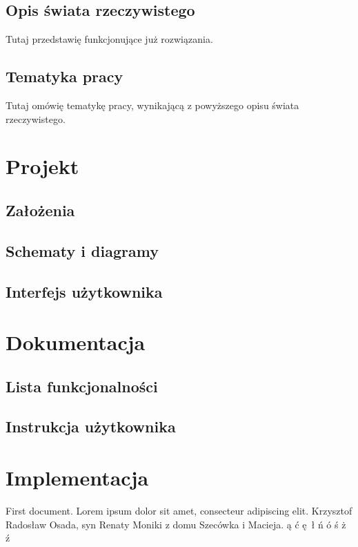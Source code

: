 \documentclass[12pt, a4paper]{article}
\begin{document}
    \subsection{Opis świata rzeczywistego}
    Tutaj przedstawię funkcjonujące już rozwiązania.

    \subsection{Tematyka pracy}
    Tutaj omówię tematykę pracy, wynikającą z powyższego opisu świata rzeczywistego.

    \section{Projekt}
    
    \subsection{Założenia}
    \subsection{Schematy i diagramy}
    \subsection{Interfejs użytkownika}

    \section{Dokumentacja}
    \subsection{Lista funkcjonalności}
    \subsection{Instrukcja użytkownika}

    \section{Implementacja}

    First document. Lorem ipsum dolor sit amet, consecteur adipiscing elit.
    Krzysztof Radosław Osada, syn Renaty Moniki z domu Szecówka i Macieja.
    ą ć ę ł ń ó ś ż ź
\end{document}
